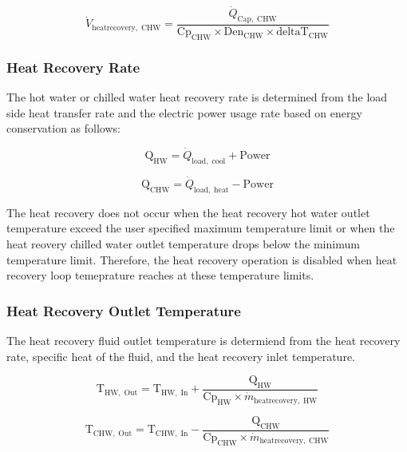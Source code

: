 \begin{equation}
\dot{V}_\mathrm{heatrecovery,\; CHW} = \frac{\dot{Q}_\mathrm{Cap,\; CHW}}{\mathrm{Cp}_\mathrm{CHW} \times \mathrm{Den}_\mathrm{CHW} \times \mathrm{deltaT}_\mathrm{CHW}}
\end{equation}

\subsubsection{Heat Recovery Rate}
The hot water or chilled water heat recovery rate is determined from the load side heat transfer rate and the electric power usage rate based on energy conservation as follows:

\begin{equation}
\mathrm{Q}_\mathrm{HW} = \dot{Q}_\mathrm{load,\; cool} + \mathrm{Power}
\end{equation}

\begin{equation}
\mathrm{Q}_\mathrm{CHW}  = \dot{Q}_\mathrm{load,\; heat} - \mathrm{Power}
\end{equation}

The heat recovery does not occur when the heat recovery hot water outlet temperature exceed the user specified maximum temperature limit or when the heat reovery chilled water outlet temperature drops below the minimum temperature limit. Therefore, the heat recovery operation is disabled when heat recovery loop temeprature reaches at these temperature limits.

\subsubsection{Heat Recovery Outlet Temperature}
The heat recovery fluid outlet temperature is determiend from the heat recovery rate, specific heat of the fluid, and the heat recovery inlet temperature.

\begin{equation}
\mathrm{T}_\mathrm{HW,\; Out} = \mathrm{T}_\mathrm{HW,\; In} + \frac{\mathrm{Q}_\mathrm{HW}}{\mathrm{Cp}_\mathrm{HW} \times \dot{m}_\mathrm{heatrecovery,\; HW}}
\end{equation}

\begin{equation}
\mathrm{T}_\mathrm{CHW,\; Out} = \mathrm{T}_\mathrm{CHW,\; In} - \frac{\mathrm{Q}_\mathrm{CHW}}{\mathrm{Cp}_\mathrm{CHW} \times \dot{m}_\mathrm{heatrecovery,\; CHW}}
\end{equation}


